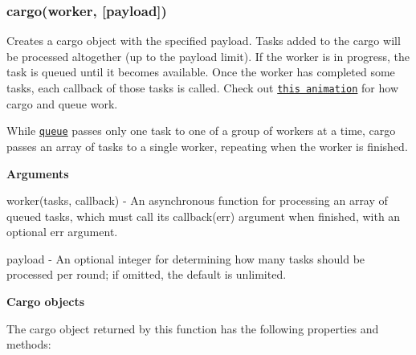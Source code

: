\label{_cargo}%
 \subsubsection*{cargo(worker, \mbox{[}payload\mbox{]})}

Creates a {\ttfamily cargo} object with the specified payload. Tasks added to the cargo will be processed altogether (up to the {\ttfamily payload} limit). If the {\ttfamily worker} is in progress, the task is queued until it becomes available. Once the {\ttfamily worker} has completed some tasks, each callback of those tasks is called. Check out \href{https://camo.githubusercontent.com/6bbd36f4cf5b35a0f11a96dcd2e97711ffc2fb37/68747470733a2f2f662e636c6f75642e6769746875622e636f6d2f6173736574732f313637363837312f36383130382f62626330636662302d356632392d313165322d393734662d3333393763363464633835382e676966}{\tt this animation} for how {\ttfamily cargo} and {\ttfamily queue} work.

While \href{#queue}{\tt queue} passes only one task to one of a group of workers at a time, cargo passes an array of tasks to a single worker, repeating when the worker is finished.

{\bfseries Arguments}


\begin{DoxyItemize}
\item {\ttfamily worker(tasks, callback)} -\/ An asynchronous function for processing an array of queued tasks, which must call its {\ttfamily callback(err)} argument when finished, with an optional {\ttfamily err} argument.
\item {\ttfamily payload} -\/ An optional {\ttfamily integer} for determining how many tasks should be processed per round; if omitted, the default is unlimited.
\end{DoxyItemize}

{\bfseries Cargo objects}

The {\ttfamily cargo} object returned by this function has the following properties and methods\+:


